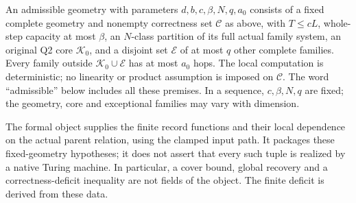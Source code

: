\begin{definition}\label{def:admissible-geometry}
An admissible geometry with parameters $d,b,c,\beta,N,q,a_0$ consists
of a fixed complete geometry and nonempty correctness set $\mathcal C$
as above, with $T\le cL$, whole-step capacity at most $\beta$, an
$N$-class partition of its full actual family system, an original Q2
core $\mathcal K_0$, and a disjoint set $\mathcal E$ of at most $q$
other complete families. Every family outside
$\mathcal K_0\cup\mathcal E$ has at most $a_0$ hops.
The local computation is deterministic; no linearity or product
assumption is imposed on $\mathcal C$. The word ``admissible'' below
includes all these premises. In a sequence, $c,\beta,N,q$ are fixed;
the geometry, core and exceptional families may vary with dimension.
\end{definition}

The formal object supplies the finite record functions and their local
dependence on the actual parent relation, using the clamped input path.
It packages these fixed-geometry hypotheses; it does not assert that every
such tuple is realized by a native Turing machine. In particular, a cover
bound, global recovery and a correctness-deficit inequality are not fields
of the object. The finite deficit is derived from these data.

